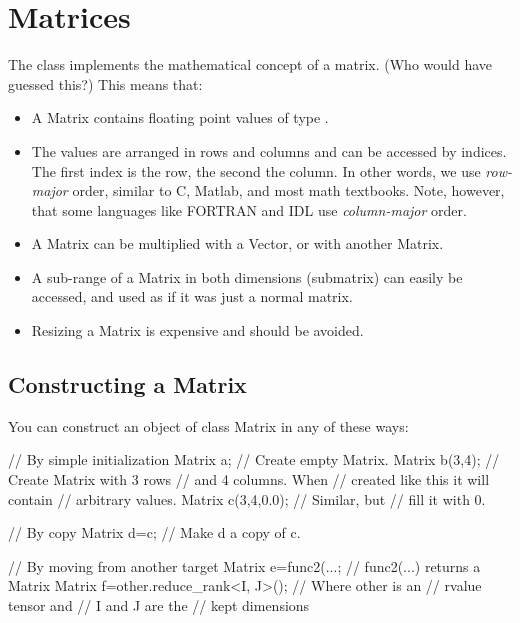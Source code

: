 \section{Matrices}
\label{sec:matpack:matrices}

The class  implements the mathematical concept of a
matrix. (Who would have guessed this?) This means that:
\begin{itemize}
\item A Matrix contains floating point values of type .
\item The values are arranged in rows and columns and can be accessed
  by indices. The first index is the row, the second the column. In
  other words, we use \emph{row-major} order, similar to C, Matlab,
  and most math textbooks. Note, however, that some languages like
  FORTRAN and IDL use \emph{column-major} order.
\item A Matrix can be multiplied with a Vector, or with another
  Matrix.
\item A sub-range of a Matrix in both dimensions (submatrix) can
  easily be accessed, and used as if it was just a normal matrix.
\item Resizing a Matrix is expensive and should be avoided.
\end{itemize}

\subsection{Constructing a Matrix}
You can construct an object of class Matrix in any of these ways:

\begin{code}
// By simple initialization
Matrix a;          // Create empty Matrix.
Matrix b(3,4);     // Create Matrix with 3 rows
                   // and 4 columns. When
                   // created like this it will contain
                   // arbitrary values.
Matrix c(3,4,0.0); // Similar, but
                   // fill it with 0.

// By copy
Matrix d=c;        // Make d a copy of c.

// By moving from another target
Matrix e=func2(...;  // func2(...) returns a Matrix
Matrix f=other.reduce_rank<I, J>();  // Where other is an
                                     // rvalue tensor and
                                     // I and J are the
                                     // kept dimensions
\end{code}

